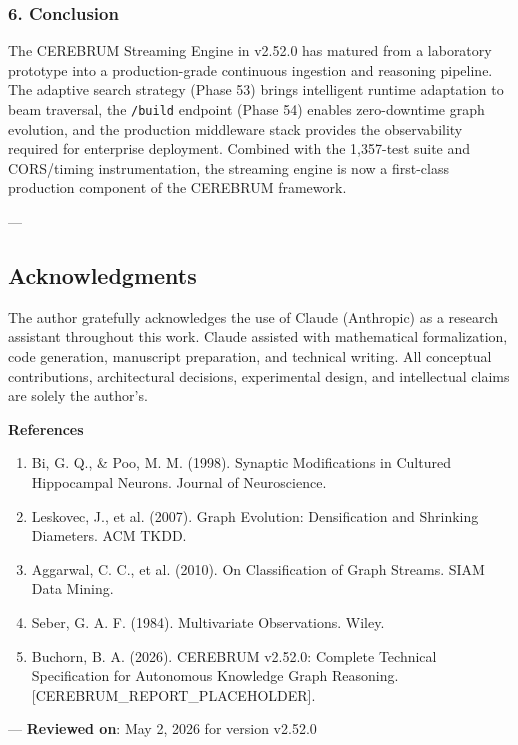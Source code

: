 \subsubsection{6. Conclusion}
The CEREBRUM Streaming Engine in v2.52.0 has matured from a laboratory prototype into a production-grade continuous ingestion and reasoning pipeline. The adaptive search strategy (Phase 53) brings intelligent runtime adaptation to beam traversal, the \texttt{/build} endpoint (Phase 54) enables zero-downtime graph evolution, and the production middleware stack provides the obser\-vability required for enterprise deployment. Combined with the 1,357-test suite and CORS/timing instr\-umentation, the streaming engine is now a first-class production component of the CEREBRUM framework.

---
\subsection{Acknow\-ledgments}

The author gratefully ackno\-wledges the use of Claude (Anthropic) as a research assistant throughout this work. Claude assisted with mathe\-matical forma\-lization, code generation, manuscript preparation, and technical writing. All conceptual contr\-ibutions, archi\-tectural decisions, exper\-imental design, and intel\-lectual claims are solely the author's.

\textbf{References}
\begin{enumerate}
\item Bi, G. Q., \& Poo, M. M. (1998). Synaptic Modifi\-cations in Cultured Hippocampal Neurons. Journal of Neuros\-cience.
\item Leskovec, J., et al. (2007). Graph Evolution: Densif\-ication and Shrinking Diameters. ACM TKDD.
\item Aggarwal, C. C., et al. (2010). On Classi\-fication of Graph Streams. SIAM Data Mining.
\item Seber, G. A. F. (1984). Multiv\-ariate Observ\-ations. Wiley.
\item Buchorn, B. A. (2026). CEREBRUM v2.52.0: Complete Technical Specif\-ication for Autonomous Knowledge Graph Reasoning. [CEREBRUM\_REPORT\_PLACEHOLDER].

\end{enumerate}
---
\textbf{Reviewed on}: May 2, 2026 for version v2.52.0
